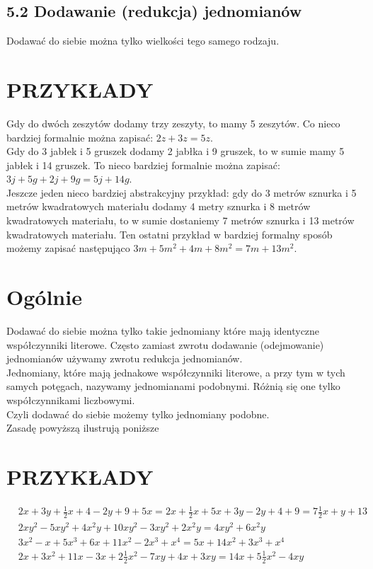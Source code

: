 \documentclass[10pt]{article}
\begin{document}
\subsection*{5.2 Dodawanie (redukcja) jednomianów}
Dodawać do siebie można tylko wielkości tego samego rodzaju.

\section*{PRZYKŁADY}
Gdy do dwóch zeszytów dodamy trzy zeszyty, to mamy 5 zeszytów. Co nieco bardziej formalnie można zapisać: \(2 z+3 z=5 z\).\\
Gdy do 3 jabłek i 5 gruszek dodamy 2 jabłka i 9 gruszek, to w sumie mamy 5 jabłek i 14 gruszek. To nieco bardziej formalnie można zapisać: \(3 j+5 g+2 j+9 g=5 j+14 g\).\\
Jeszcze jeden nieco bardziej abstrakcyjny przykład: gdy do 3 metrów sznurka i 5 metrów kwadratowych materiału dodamy 4 metry sznurka i 8 metrów kwadratowych materiału, to w sumie dostaniemy 7 metrów sznurka i 13 metrów kwadratowych materiału. Ten ostatni przykład w bardziej formalny sposób możemy zapisać następująco \(3 m+5 m^{2}+4 m+8 m^{2}=7 m+13 m^{2}\).

\section*{Ogólnie}
Dodawać do siebie można tylko takie jednomiany które mają identyczne współczynniki literowe. Często zamiast zwrotu dodawanie (odejmowanie) jednomianów używamy zwrotu redukcja jednomianów.\\
Jednomiany, które mają jednakowe współczynniki literowe, a przy tym w tych samych potęgach, nazywamy jednomianami podobnymi. Różnią się one tylko współczynnikami liczbowymi.\\
Czyli dodawać do siebie możemy tylko jednomiany podobne.\\
Zasadę powyższą ilustrują poniższe

\section*{PRZYKŁADY}
\[
\begin{aligned}
& 2 x+3 y+\frac{1}{2} x+4-2 y+9+5 x=2 x+\frac{1}{2} x+5 x+3 y-2 y+4+9=7 \frac{1}{2} x+y+13 \\
& 2 x y^{2}-5 x y^{2}+4 x^{2} y+10 x y^{2}-3 x y^{2}+2 x^{2} y=4 x y^{2}+6 x^{2} y \\
& 3 x^{2}-x+5 x^{3}+6 x+11 x^{2}-2 x^{3}+x^{4}=5 x+14 x^{2}+3 x^{3}+x^{4} \\
& 2 x+3 x^{2}+11 x-3 x+2 \frac{1}{2} x^{2}-7 x y+4 x+3 x y=14 x+5 \frac{1}{2} x^{2}-4 x y
\end{aligned}
\]
\end{document}
